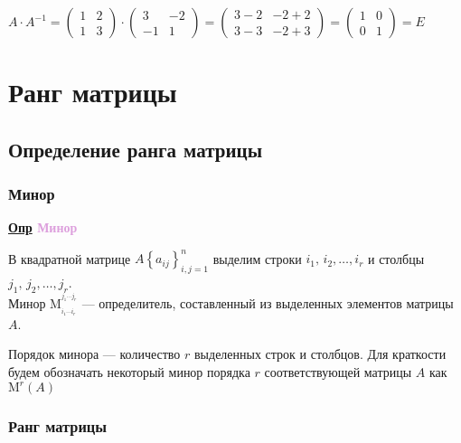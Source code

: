 \documentclass[12pt, a4paper]{report}
\newcommand{\df}[1][]{\begin{flushleft}\textbf{\underline{Опр} \textcolor{Plum}{#1}}\end{flushleft}}
\newcommand{\inlineperm}[3][i]{{#1}_{#2}\dotsb{#1}_{#3}}
\begin{document}
	\bigskip\(A\cdot A^{-1}=\begin{pmatrix}1&2\\1&3\end{pmatrix}\cdot\begin{pmatrix}3&-2\\-1&1\end{pmatrix}=\begin{pmatrix}3-2&-2+2\\3-3&-2+3\end{pmatrix}=\begin{pmatrix}1&0\\0&1\end{pmatrix}=E\)
	
	\chapter{Ранг матрицы}
	\section{Определение ранга матрицы}
	\subsection{Минор}
	\df[Минор]
	
	В квадратной матрице \(A\left\{a_{ij}\right\}_{i,j=1}^{n}\) выделим строки \(i_1,\,i_2,\dotsc,i_r\) и столбцы \(j_1,\,j_2,\dotsc,j_r\).\\Минор \(\mathrm{M}_{_{\inlineperm{1}{r}}}^{^{\inlineperm[j]{1}{r}}}\) --- определитель, составленный из выделенных элементов матрицы \(A\).
	
	\bigskip Порядок минора --- количество \(r\) выделенных строк и столбцов. Для краткости будем обозначать некоторый минор порядка \(r\) соответствующей матрицы \(A\) как \(\mathrm{M}^{r}\left(A\right)\)
	\subsection{Ранг матрицы}
\end{document}
